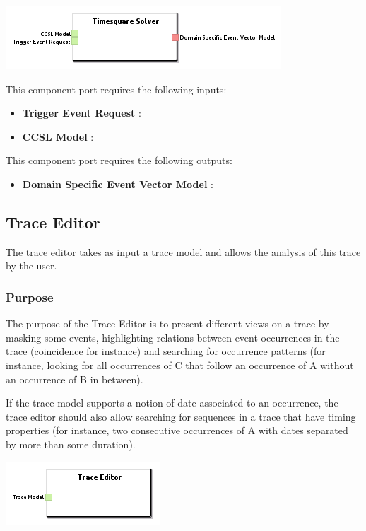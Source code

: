 \documentclass{gemoc} %
\begin{document}
\begin{center}
\includegraphics*[trim=0.0cm 0.0cm 0cm 0.0cm, clip=true]{../images/generated/Generated_Timesquare_Solver.png}
\end{center}

This component port requires the following inputs:
\begin{itemize}
  \item \textbf{Trigger Event Request} :
  \item \textbf{CCSL Model} :
\end{itemize}

This component port requires the following outputs:
\begin{itemize}
  \item \textbf{Domain Specific Event Vector Model} :
\end{itemize}

\subsection{Trace Editor}
The trace editor takes as input a trace model and allows the analysis of this trace by the user.

\subsubsection{Purpose}
The purpose of the Trace Editor is to present different views on a trace by masking some events, highlighting relations between event occurrences in the trace (coincidence for instance) and searching for occurrence patterns (for instance, looking for all occurrences of C that follow an occurrence of A without an occurrence of B in between).
 
If the trace model supports a notion of date associated to an occurrence, the trace editor should also allow searching for sequences in a trace that have timing properties (for instance, two consecutive occurrences of A with dates separated by more than some duration).
\begin{center}
\includegraphics*[trim=0.0cm 0.0cm 0cm 0.0cm, clip=true]{../images/generated/Generated_Trace_Editor.png}
\end{center}
\end{document}
